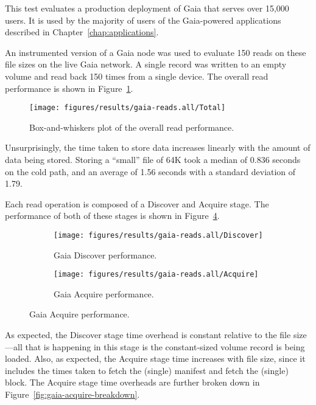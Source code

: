 This test evaluates a production deployment of Gaia that serves over
15,000 users.  It is used by the majority of users of the Gaia-powered
applications described in Chapter~\ref{chap:applications}.

An instrumented version of a Gaia node was used to evaluate 150 reads on these
file sizes on the live Gaia network.  A single record was written to an empty
volume and read back 150 times from a single device.
The overall read performance is shown in
Figure~\ref{fig:gaia-read-total}.

\begin{figure}[htp!]
   \centering
   \caption{Box-and-whiskers plot of the overall read performance.}
   \texttt{[image: figures/results/gaia-reads.all/Total]}
   \label{fig:gaia-read-total}
\end{figure}

Unsurprisingly, the time taken to store data increases linearly with the amount
of data being stored.  Storing a ``small'' file of 64K took a median of 0.836
seconds on the cold path, and an average of 1.56 seconds with a standard
deviation of 1.79.

Each read operation is composed of a Discover and Acquire stage.  The
performance of both of these stages is shown in
Figure~\ref{fig:gaia-read-stages}.

\begin{figure}[htp!]
   \centering
   \caption{Box-and-whiskers plots of access flow stage performances in Gaia,
   for file sizes between 64K and 640K in increments of 64K.}
   \begin{subfigure}[b]{.8\textwidth}
      \texttt{[image: figures/results/gaia-reads.all/Discover]}
      \label{fig:gaia-read-discover}
      \caption{Gaia Discover performance.}
   \end{subfigure}
   \begin{subfigure}[b]{.8\textwidth}
      \texttt{[image: figures/results/gaia-reads.all/Acquire]}
      \label{fig:gaia-read-acquire}
      \caption{Gaia Acquire performance.}
   \end{subfigure}
   \label{fig:gaia-read-stages}
\end{figure}

As expected, the Discover stage time overhead is constant relative to the file
size---all that is happening in this stage is the constant-sized 
volume record is being loaded.
Also, as expected, the Acquire stage time increases with file size, since
it includes the times taken to fetch the (single) manifest and fetch the (single) block.
The Acquire stage time overheads are further broken down in
Figure~\ref{fig:gaia-acquire-breakdown}.

